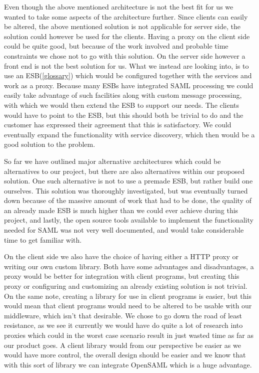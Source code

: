 \documentclass[12pt]{article}
\begin{document}
        Even though the above mentioned architecture is not the best fit for us we wanted to take some aspects of the architecture further. Since clients can easily be altered, the above mentioned solution is not applicable for server side, the solution could however be used for the clients. Having a proxy on the client side could be quite good, but because of the work involved and probable time constraints we chose not to go with this solution. On the server side however a front end is not the best solution for us. What we instead are looking into, is to use an ESB(\ref{glossary}) which would be configured together with the services and work as a proxy. Because many ESBs have integrated SAML processing we could easily take advantage of such facilities along with custom message processing, with which we would then extend the ESB to support our needs. The clients would have to point to the ESB, but this should both be trivial to do and the customer has expressed their agreement that this is satisfactory. We could eventually expand the functionality with service discovery, which then would be a good solution to the problem.

        So far we have outlined major alternative architectures which could be alternatives to our project, but there are also alternatives within our proposed solution. One such alternative is not to use a premade ESB, but rather build one ourselves. This solution was thoroughly investigated, but was eventually turned down because of the massive amount of work that had to be done, the quality of an already made ESB is much higher than we could ever achieve during this project, and lastly, the open source tools available to implement the functionality needed for SAML was not very well documented, and would take considerable time to get familiar with.

        On the client side we also have the choice of having either a HTTP proxy or writing our own custom library. Both have some advantages and disadvantages, a proxy would be better for integration with client programs, but creating this proxy or configuring and customizing an already existing solution is not trivial. On the same note, creating a library for use in client programs is easier, but this would mean that client programs would need to be altered to be usable with our middleware, which isn’t that desirable. We chose to go down the road of least resistance, as we see it currently we would have do quite a lot of research into proxies which could in the worst case scenario result in just wasted time as far as our product goes. A client library would from our perspective be easier as we would have more control, the overall design should be easier and we know that with this sort of library we can integrate OpenSAML which is a huge advantage.  
              
\end{document}
